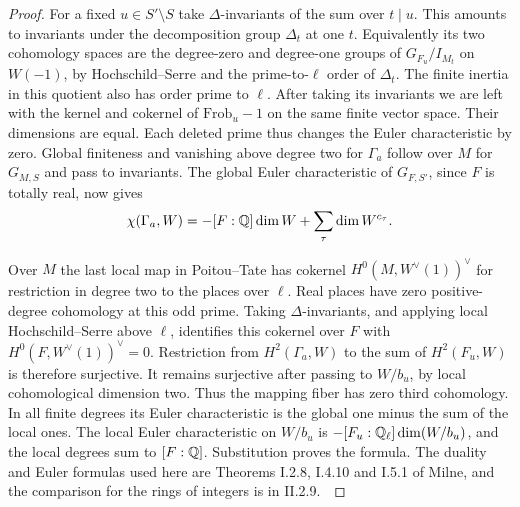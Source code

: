\documentclass[a4paper,11pt]{article}
\theoremstyle{definition}
\theoremstyle{remark}
\numberwithin{equation}{section}
\begin{document}
\begin{proof}
For a fixed \(u\in S'\setminus S\) take \(\Delta\)-invariants
of the sum over \(t\mid u\). This amounts to invariants under
the decomposition group \(\Delta_t\) at one \(t\). Equivalently
its two cohomology spaces are the degree-zero and degree-one
groups of \(G_{F_u}/I_{M_t}\) on \(W(-1)\), by Hochschild--Serre
and the prime-to-\(\ell\) order of \(\Delta_t\). The finite
inertia in this quotient also has order prime to \(\ell\).
After taking its invariants we are left with the kernel and
cokernel of \(\mathrm{Frob}_u-1\) on the same finite vector
space. Their dimensions are equal. Each deleted prime thus
changes the Euler characteristic by zero. Global finiteness
and vanishing above degree two for \(\Gamma_a\) follow over
\(M\) for \(G_{M,S}\) and pass to invariants. The global
Euler characteristic of \(G_{F,S'}\), since \(F\) is totally
real, now gives
\[
       \chi(\Gamma_a,W)
            =-[F:\mathbb Q]\dim W+\sum_\tau\dim W^{c_\tau}.
\]

Over \(M\) the last local map in Poitou--Tate has cokernel
\(H^0(M,W^\vee(1))^\vee\) for restriction in degree two to
the places over \(\ell\). Real places have zero positive-degree
cohomology at this odd prime. Taking \(\Delta\)-invariants,
and applying local Hochschild--Serre above \(\ell\), identifies
this cokernel over \(F\) with \(H^0(F,W^\vee(1))^\vee=0\).
Restriction from \(H^2(\Gamma_a,W)\) to the sum of
\(H^2(F_u,W)\) is therefore surjective. It remains surjective
after passing to \(W/b_u\), by local cohomological dimension
two. Thus the mapping fiber has zero third cohomology. In
all finite degrees its Euler characteristic is the global one
minus the sum of the local ones. The local Euler characteristic
on \(W/b_u\) is \(-[F_u:\mathbb Q_\ell]\dim(W/b_u)\), and the
local degrees sum to \([F:\mathbb Q]\). Substitution proves the
formula. The duality and Euler formulas used here are
Theorems I.2.8, I.4.10 and I.5.1 of Milne, and the comparison
for the rings of integers is in II.2.9.~\cite{VII-V-V-milne98}
\end{proof}
\end{document}
